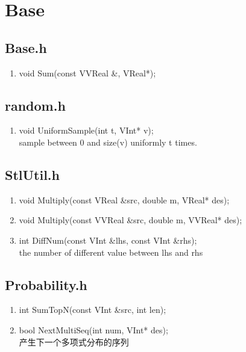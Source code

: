 \chapter{Base}
\section{Base.h}
\begin{enumerate}
\item void Sum(const VVReal \&, VReal*);
\end{enumerate}
\section{random.h}

\begin{enumerate}
\item void UniformSample(int t, VInt* v);
\\sample between 0 and size(v) uniformly t times.
\end{enumerate}

\section{StlUtil.h}
\begin{enumerate}
\item void Multiply(const VReal \&src, double m, VReal* des);
\item void Multiply(const VVReal \&src, double m, VVReal* des);
\item int DiffNum(const VInt \&lhs, const VInt \&rhs);
\\ the number of different value between lhs and rhs
\end{enumerate}

\section{Probability.h}
\begin{enumerate}
\item int SumTopN(const VInt \&src, int len);
\item bool NextMultiSeq(int num, VInt* des);
\\ 产生下一个多项式分布的序列
\end{enumerate}

